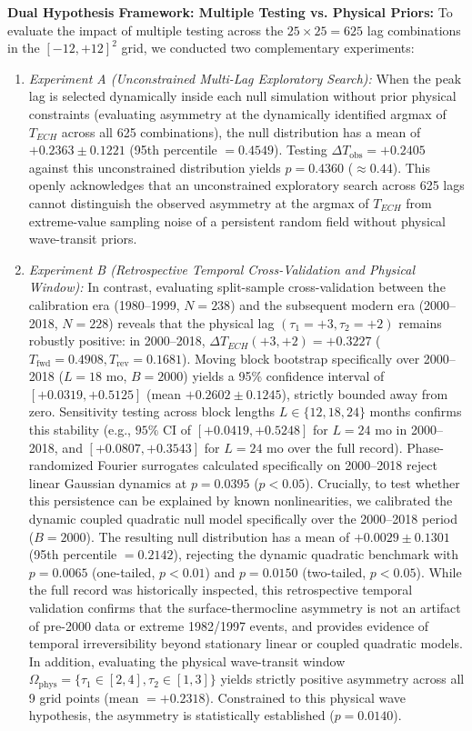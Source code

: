 \documentclass[11pt,a4paper]{article}
\begin{document}
\textbf{Dual Hypothesis Framework: Multiple Testing vs. Physical Priors:}
To evaluate the impact of multiple testing across the $25 \times 25 = 625$ lag combinations in the $[-12, +12]^2$ grid, we conducted two complementary experiments:
\begin{enumerate}
    \item \textit{Experiment A (Unconstrained Multi-Lag Exploratory Search):} When the peak lag is selected dynamically inside each null simulation without prior physical constraints (evaluating asymmetry at the dynamically identified argmax of $T_{ECH}$ across all 625 combinations), the null distribution has a mean of $+0.2363 \pm 0.1221$ (95th percentile $= 0.4549$). Testing $\Delta T_{\text{obs}} = +0.2405$ against this unconstrained distribution yields \textbf{$p = 0.4360$} ($\approx 0.44$). This openly acknowledges that an unconstrained exploratory search across 625 lags cannot distinguish the observed asymmetry at the argmax of $T_{ECH}$ from extreme-value sampling noise of a persistent random field without physical wave-transit priors.
    \item \textit{Experiment B (Retrospective Temporal Cross-Validation and Physical Window):} In contrast, evaluating split-sample cross-validation between the calibration era (1980--1999, $N = 238$) and the subsequent modern era (2000--2018, $N = 228$) reveals that the physical lag $(\tau_1 = +3, \tau_2 = +2)$ remains robustly positive: in 2000--2018, $\Delta T_{ECH}(+3, +2) = \mathbf{+0.3227}$ ($T_{\text{fwd}} = 0.4908, T_{\text{rev}} = 0.1681$). Moving block bootstrap specifically over 2000--2018 ($L=18$ mo, $B=2000$) yields a 95\% confidence interval of $[+0.0319, +0.5125]$ (mean $+0.2602 \pm 0.1245$), strictly bounded away from zero. Sensitivity testing across block lengths $L \in \{12, 18, 24\}$ months confirms this stability (e.g., $95\%$ CI of $[+0.0419, +0.5248]$ for $L=24$ mo in 2000--2018, and $[+0.0807, +0.3543]$ for $L=24$ mo over the full record). Phase-randomized Fourier surrogates calculated specifically on 2000--2018 reject linear Gaussian dynamics at \textbf{$p = 0.0395$} ($p < 0.05$). Crucially, to test whether this persistence can be explained by known nonlinearities, we calibrated the dynamic coupled quadratic null model specifically over the 2000--2018 period ($B=2000$). The resulting null distribution has a mean of $+0.0029 \pm 0.1301$ (95th percentile $= 0.2142$), rejecting the dynamic quadratic benchmark with \textbf{$p = 0.0065$} (one-tailed, $p < 0.01$) and \textbf{$p = 0.0150$} (two-tailed, $p < 0.05$). While the full record was historically inspected, this retrospective temporal validation confirms that the surface-thermocline asymmetry is not an artifact of pre-2000 data or extreme 1982/1997 events, and provides evidence of temporal irreversibility beyond stationary linear or coupled quadratic models. In addition, evaluating the physical wave-transit window $\Omega_{\text{phys}} = \{\tau_1 \in [2,4], \tau_2 \in [1,3]\}$ yields strictly positive asymmetry across all 9 grid points (mean $= +0.2318$). Constrained to this physical wave hypothesis, the asymmetry is statistically established ($p = 0.0140$).
\end{enumerate}
\end{document}
